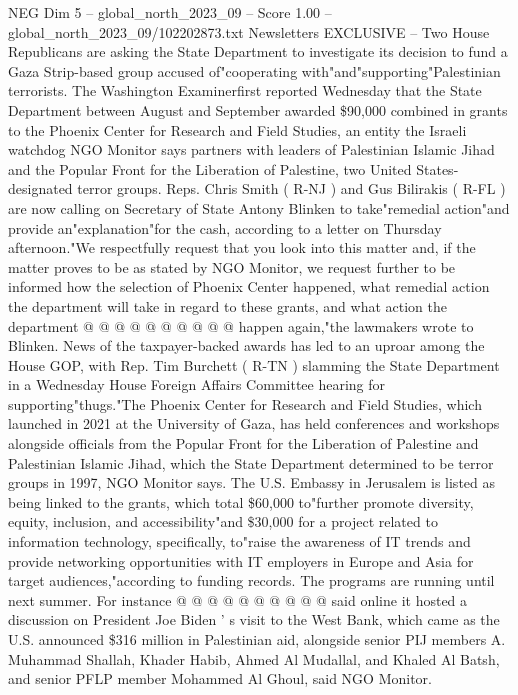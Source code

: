 \begin{textsample}{NEG Dim 5 – global\_north\_2023\_09 – Score 1.00 – global\_north\_2023\_09/102202873.txt}  \label{ex:f5_neg_016}
Newsletters EXCLUSIVE -- Two House Republicans are asking the State Department to investigate its decision to fund a Gaza Strip-based group accused of"cooperating with"and"supporting"Palestinian terrorists.
The Washington Examinerfirst reported Wednesday that the State Department between August and September awarded \$90,000 combined in grants to the Phoenix Center for Research and Field Studies, an entity the Israeli watchdog NGO Monitor says partners with leaders of Palestinian Islamic Jihad and the Popular Front for the Liberation of Palestine, two United States-designated terror groups.
Reps.
Chris Smith ( R-NJ ) and Gus Bilirakis ( R-FL ) are now calling on Secretary of State Antony Blinken to take"remedial action"and provide an"explanation"for the cash, according to a letter on Thursday afternoon."We respectfully request that you look into this matter and, if the matter proves to be as stated by NGO Monitor, we request further to be informed how the selection of Phoenix Center happened, what remedial action the department will take in regard to these grants, and what action the department @ @ @ @ @ @ @ @ @ @ happen again,"the lawmakers wrote to Blinken.
News of the taxpayer-backed awards has led to an uproar among the House GOP, with Rep.
Tim Burchett ( R-TN ) slamming the State Department in a Wednesday House Foreign Affairs Committee hearing for supporting"thugs."The Phoenix Center for Research and Field Studies, which launched in 2021 at the University of Gaza, has held conferences and workshops alongside officials from the Popular Front for the Liberation of Palestine and Palestinian Islamic Jihad, which the State Department determined to be terror groups in 1997, NGO Monitor says.
The U.S.
Embassy in Jerusalem is listed as being linked to the grants, which total \$60,000 to"further promote diversity, equity, inclusion, and accessibility"and \$30,000 for a project related to information technology, specifically, to"raise the awareness of IT trends and provide networking opportunities with IT employers in Europe and Asia for target audiences,"according to funding records.
The programs are running until next summer.
For instance @ @ @ @ @ @ @ @ @ @ said online it hosted a discussion on President Joe Biden ' s visit to the West Bank, which came as the U.S. announced \$316 million in Palestinian aid, alongside senior PIJ members A.
Muhammad Shallah, Khader Habib, Ahmed Al Mudallal, and Khaled Al Batsh, and senior PFLP member Mohammed Al Ghoul, said NGO Monitor.

\end{textsample}
